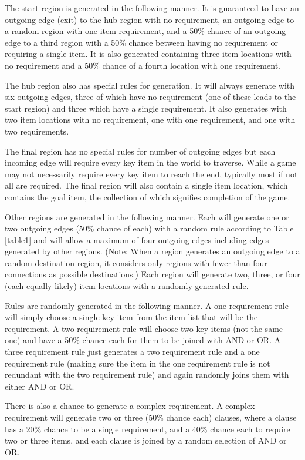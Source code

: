 \documentclass{ieeeaccess}
\begin{document}
The start region is generated in the following manner. It is guaranteed to have an outgoing
edge (exit) to the hub region with no requirement, an outgoing edge to a random region with one
item requirement, and a 50\% chance of an outgoing edge to a third region with a 50\% chance
between having no requirement or requiring a single item. It is also generated containing three
item locations with no requirement and a 50\% chance of a fourth location with one requirement.

The hub region also has special rules for generation. It will always generate with six outgoing
edges, three of which have no requirement (one of these leads to the start region) and three
which have a single requirement. It also generates with two item locations with no requirement,
one with one requirement, and one with two requirements.

The final region has no special rules for number of outgoing edges but each incoming edge will
require every key item in the world to traverse. While a game may not necessarily require every
key item to reach the end, typically most if not all are required. The final region will also
contain a single item location, which contains the goal item, the collection of which signifies
completion of the game.

Other regions are generated in the following manner. Each will generate one or two outgoing
edges (50\% chance of each) with a random rule according to Table \ref{table1} and will allow a
maximum of four outgoing edges including edges generated by other regions.
(Note:  When a region generates an outgoing edge to a random destination region, it considers
only regions with fewer than four connections as possible destinations.)
Each region will generate two, three, or four (each equally likely) item locations with a
randomly generated rule.

Rules are randomly generated in the following manner. A one requirement rule will simply choose
a single key item from the item list that will be the requirement. A two requirement rule will
choose two key items (not the same one) and have a 50\% chance each for them to be joined with
AND or OR. A three requirement rule just generates a two requirement rule and a one requirement
rule (making sure the item in the one requirement rule is not redundant with the two
requirement rule) and again randomly joins them with either AND or OR.

There is also a chance to generate a complex requirement. A complex requirement will generate
two or three (50\% chance each) clauses, where a clause has a 20\% chance to be a single
requirement, and a 40\% chance each to require two or three items, and each clause is
joined by a random selection of AND or OR.
\end{document}
